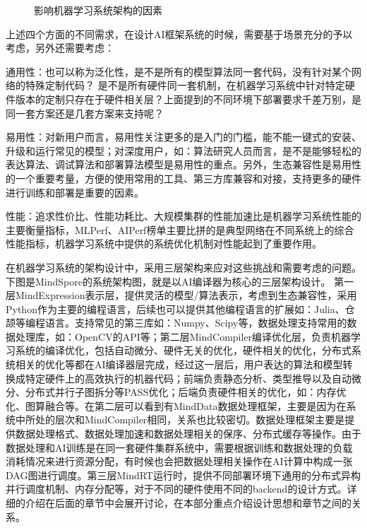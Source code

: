 \documentclass[letterpaper,10pt,english]{sphinxmanual}
\begin{document}
\begin{figure}[H]
\centering
\capstart

\noindent{}
\caption{影响机器学习系统架构的因素}\label{\detokenize{chapter_preface_advanced/index:id2}}\end{figure}

\sphinxAtStartPar
​
上述四个方面的不同需求，在设计AI框架系统的时候，需要基于场景充分的予以考虑，另外还需要考虑：

\sphinxAtStartPar
通用性：也可以称为泛化性，是不是所有的模型算法同一套代码，没有针对某个网络的特殊定制代码？
是不是所有硬件同一套机制，在机器学习系统中针对特定硬件版本的定制只存在于硬件相关层？上面提到的不同环境下部署要求千差万别，是同一套方案还是几套方案来支持呢？

\sphinxAtStartPar
易用性：对新用户而言，易用性关注更多的是入门的门槛，能不能一键式的安装、升级和运行常见的模型；对深度用户，如：算法研究人员而言，是不是能够轻松的表达算法、调试算法和部署算法模型是易用性的重点。另外，生态兼容性是易用性的一个重要考量，方便的使用常用的工具、第三方库兼容和对接，支持更多的硬件进行训练和部署是重要的因素。

\sphinxAtStartPar
性能：追求性价比、性能功耗比、大规模集群的性能加速比是机器学习系统性能的主要衡量指标，MLPerf、AIPerf榜单主要比拼的是典型网络在不同系统上的综合性能指标，机器学习系统中提供的系统优化机制对性能起到了重要作用。

\sphinxAtStartPar
​
在机器学习系统的架构设计中，采用三层架构来应对这些挑战和需要考虑的问题。
下图是MindSpore的系统架构图，就是以AI编译器为核心的三层架构设计。 ​
第一层MindExpression表示层，提供灵活的模型/算法表示，考虑到生态兼容性，采用Python作为主要的编程语言，后续也可以提供其他编程语言的扩展如：Julia、仓颉等编程语言。支持常见的第三库如：Numpy、Scipy等，数据处理支持常用的数据处理库，如：OpenCV的API等；
​
第二层MindCompiler编译优化层，负责机器学习系统的编译优化，包括自动微分、硬件无关的优化，硬件相关的优化，分布式系统相关的优化等都在AI编译器层完成，经过这一层后，用户表达的算法和模型转换成特定硬件上的高效执行的机器代码；前端负责静态分析、类型推导以及自动微分、分布式并行子图拆分等PASS优化；后端负责硬件相关的优化，如：内存优化、图算融合等。在第二层可以看到有MindData数据处理框架，主要是因为在系统中所处的层次和MindCompiler相同，关系也比较密切。数据处理框架主要是提供数据处理格式、数据处理加速和数据处理相关的保序、分布式缓存等操作。由于数据处理和AI训练是在同一套硬件集群系统中，需要根据训练和数据处理的负载消耗情况来进行资源分配，有时候也会把数据处理相关操作在AI计算中构成一张DAG图进行调度。
​
第三层MindRT运行时，提供不同部署环境下通用的分布式异构并行调度机制、内存分配等，对于不同的硬件使用不同的backend的设计方式。详细的介绍在后面的章节中会展开讨论，在本部分重点介绍设计思想和章节之间的关系。
\end{document}
